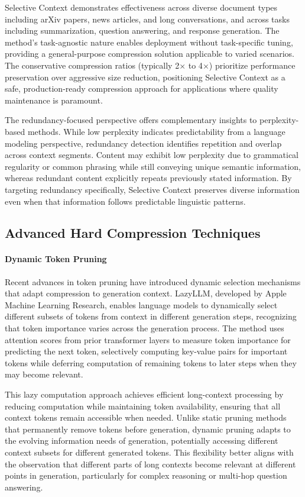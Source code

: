 Selective Context demonstrates effectiveness across diverse document types including arXiv papers, news articles, and long conversations, and across tasks including summarization, question answering, and response generation. The method's task-agnostic nature enables deployment without task-specific tuning, providing a general-purpose compression solution applicable to varied scenarios. The conservative compression ratios (typically 2$\times$ to 4$\times$) prioritize performance preservation over aggressive size reduction, positioning Selective Context as a safe, production-ready compression approach for applications where quality maintenance is paramount.

The redundancy-focused perspective offers complementary insights to perplexity-based methods. While low perplexity indicates predictability from a language modeling perspective, redundancy detection identifies repetition and overlap across context segments. Content may exhibit low perplexity due to grammatical regularity or common phrasing while still conveying unique semantic information, whereas redundant content explicitly repeats previously stated information. By targeting redundancy specifically, Selective Context preserves diverse information even when that information follows predictable linguistic patterns.

\subsection{Advanced Hard Compression Techniques}

\paragraph{Dynamic Token Pruning}

Recent advances in token pruning have introduced dynamic selection mechanisms that adapt compression to generation context. LazyLLM, developed by Apple Machine Learning Research, enables language models to dynamically select different subsets of tokens from context in different generation steps, recognizing that token importance varies across the generation process. The method uses attention scores from prior transformer layers to measure token importance for predicting the next token, selectively computing key-value pairs for important tokens while deferring computation of remaining tokens to later steps when they may become relevant.

This lazy computation approach achieves efficient long-context processing by reducing computation while maintaining token availability, ensuring that all context tokens remain accessible when needed. Unlike static pruning methods that permanently remove tokens before generation, dynamic pruning adapts to the evolving information needs of generation, potentially accessing different context subsets for different generated tokens. This flexibility better aligns with the observation that different parts of long contexts become relevant at different points in generation, particularly for complex reasoning or multi-hop question answering.

